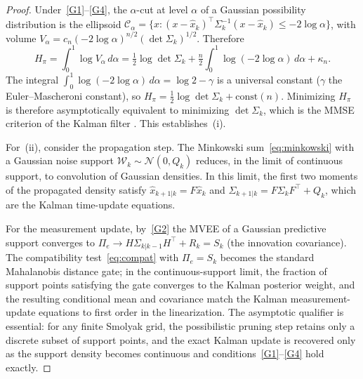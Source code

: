 \documentclass[12pt]{article}
\begin{document}
\begin{proof}
Under~\eqref{G1}--\eqref{G4}, the $\alpha$-cut at level $\alpha$ of a Gaussian
possibility distribution is the ellipsoid
$\mathcal{C}_\alpha = \{x: (x-\hat{x}_k)^\top\Sigma_k^{-1}(x-\hat{x}_k)\le -2\log\alpha\}$,
with volume $V_\alpha = c_n(-2\log\alpha)^{n/2}(\det\Sigma_k)^{1/2}$.
Therefore
\begin{equation}
H_\pi = \int_0^1\log V_\alpha\,d\alpha
= \tfrac{1}{2}\log\det\Sigma_k + \tfrac{n}{2}\int_0^1\log(-2\log\alpha)\,d\alpha + \kappa_n.
\label{eq:gaussian_Hpi}
\end{equation}
The integral $\int_0^1\log(-2\log\alpha)\,d\alpha = \log 2 - \gamma$ is a universal
constant ($\gamma$ the Euler--Mascheroni constant), so
$H_\pi=\frac{1}{2}\log\det\Sigma_k+\mathrm{const}(n)$.
Minimizing $H_\pi$ is therefore asymptotically equivalent to minimizing $\det\Sigma_k$,
which is the MMSE criterion of the Kalman filter \cite{kalman1960}.
This establishes~(i).

For~(ii), consider the propagation step.
The Minkowski sum~\eqref{eq:minkowski} with a Gaussian noise support
$\mathcal{W}_k\sim\mathcal{N}(0,Q_k)$ reduces, in the limit of continuous support,
to convolution of Gaussian densities.
In this limit, the first two moments of the propagated density satisfy
$\hat{x}_{k+1|k}=F\hat{x}_k$ and $\Sigma_{k+1|k}=F\Sigma_k F^\top+Q_k$,
which are the Kalman time-update equations.

For the measurement update, by~\eqref{G2} the MVEE of a Gaussian predictive
support converges to $\Pi_e \to H\Sigma_{k|k-1}H^\top + R_k = S_k$
(the innovation covariance).
The compatibility test~\eqref{eq:compat} with $\Pi_e=S_k$ becomes the standard
Mahalanobis distance gate; in the continuous-support limit, the fraction of
support points satisfying the gate converges to the Kalman posterior weight,
and the resulting conditional mean and covariance match the Kalman
measurement-update equations to first order in the linearization.
The asymptotic qualifier is essential: for any finite Smolyak grid, the
possibilistic pruning step retains only a discrete subset of support points,
and the exact Kalman update is recovered only as the support density becomes
continuous and conditions~\eqref{G1}--\eqref{G4} hold exactly.
\end{proof}
\end{document}
